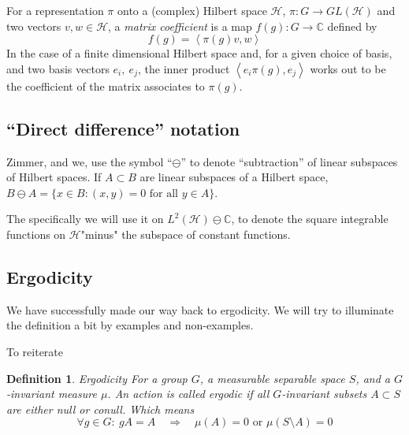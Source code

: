 \documentclass[
  12pt
]{article}
\newtheorem{defn}{Definition}[thm]
\theoremstyle{plain}
\newcommand{\bbc}{\ensuremath{\mathbb{C}}\xspace}
\newcommand{\hilb}{\ensuremath{\mathscr{H}}\xspace}
\newcommand{\inn}[1]{\left\langle #1 \right\rangle}
\begin{document}
  For a representation $\pi$ onto a (complex) Hilbert space \hilb, $\pi:G \rightarrow GL(\hilb)$
  and two vectors $v, w \in \hilb$,
  a \emph{matrix coefficient} is a map $f(g): G \rightarrow \bbc$ defined by
  $$
  f(g) = \inn{\pi(g)v, w}
  $$
  In the case of a finite dimensional Hilbert space and, for a given choice of basis, and two basis vectors $e_i,\ e_j$,
  the inner product $\inn{e_i\pi(g), e_j}$ works out to be the coefficient of the matrix associates to $\pi(g)$.






  \hypertarget{direct-difference-notation}{%
  \subsection{``Direct difference''
  notation}\label{direct-difference-notation}}

  Zimmer, and we, use the symbol ``$\ominus$'' to denote ``subtraction''
  of linear subspaces of Hilbert spaces. If $A \subset B$ are linear
  subspaces of a Hilbert space,
  $B \ominus A = \{x \in B: (x,y) = 0 \text{ for all }y \in A\}$.

  The specifically we will use it on $L^2(\hilb) \ominus \bbc$, to denote
  the square integrable functions on \hilb "minus" the subspace of constant functions.


  \hypertarget{ergodicity}{%
  \subsection{Ergodicity}\label{ergodicity}}


  We have successfully made our way back to ergodicity. We will try to
  illuminate the definition a bit by examples and non-examples.

  To reiterate %

  \begin{defn}{Ergodicity}
  For a group $G$, a measurable separable space $S$, and a $G$-invariant
  measure $\mu$. An action is called ergodic if all $G$-invariant subsets
  $A\subset S$ are either null or conull. Which means
  $$
  \forall g\in G:\ gA = A \quad \Rightarrow \quad \mu(A)=0 \text{ or }
  \mu(S\setminus A)=0
  $$
  \end{defn}
\end{document}
